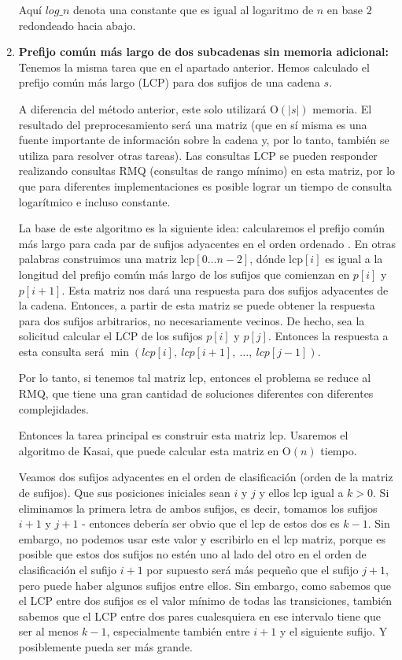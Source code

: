 \begin{enumerate}
Aquí $log\_n$ denota una constante que es igual al logaritmo de $n$ en base $2$ redondeado hacia abajo.
	
	\item \textbf{Prefijo común más largo de dos subcadenas sin memoria adicional:} Tenemos la misma tarea que en el apartado anterior. Hemos calculado el prefijo común más largo (LCP) para dos sufijos de una cadena $s$.

A diferencia del método anterior, este solo utilizará O$(|s|)$ memoria. El resultado del preprocesamiento será una matriz (que en sí misma es una fuente
importante de información sobre la cadena y, por lo tanto, también se utiliza para resolver otras tareas). Las consultas LCP se pueden responder realizando 
consultas RMQ (consultas de rango mínimo) en esta matriz, por lo que para diferentes implementaciones es posible lograr un tiempo de consulta logarítmico e 
incluso constante.

La base de este algoritmo es la siguiente idea: calcularemos el prefijo común más largo para cada par de sufijos adyacentes en el orden ordenado . En otras 
palabras construimos una matriz $\text{lcp}[0 \dots n-2]$, dónde $\text{lcp}[i]$ es igual a la longitud del prefijo común más largo de los sufijos que 
comienzan en $p[i]$ y $p[i+1]$. Esta matriz nos dará una respuesta para dos sufijos adyacentes de la cadena. Entonces, a partir de esta matriz se puede
obtener la respuesta para dos sufijos arbitrarios, no necesariamente vecinos. De hecho, sea la solicitud calcular el LCP de los sufijos $p[i]$ y $p[j]$. 
Entonces la respuesta a esta consulta será $\min(lcp[i],~lcp[i+1],~\dots,~lcp[j-1])$.

Por lo tanto, si tenemos tal matriz $\text{lcp}$, entonces el problema se reduce al RMQ, que tiene una gran cantidad de soluciones diferentes con diferentes
complejidades.

Entonces la tarea principal es construir esta matriz $\text{lcp}$. Usaremos el algoritmo de Kasai, que puede calcular esta matriz en O$(n)$ tiempo.

Veamos dos sufijos adyacentes en el orden de clasificación (orden de la matriz de sufijos). Que sus posiciones iniciales sean $i$ y $j$ y ellos $\text{lcp}$
igual a $k>0$. Si eliminamos la primera letra de ambos sufijos, es decir, tomamos los sufijos $i+1$ y $j+1$ - entonces debería ser obvio que el $\text{lcp}$ de
estos dos es $k-1$. Sin embargo, no podemos usar este valor y escribirlo en el $\text{lcp}$ matriz, porque es posible que estos dos sufijos no estén uno al
lado del otro en el orden de clasificación el sufijo $i+1$ por supuesto será más pequeño que el sufijo $j+1$, pero puede haber algunos sufijos entre ellos. 
Sin embargo, como sabemos que el LCP entre dos sufijos es el valor mínimo de todas las transiciones, también sabemos que el LCP entre dos pares cualesquiera en
ese intervalo tiene que ser al menos $k-1$, especialmente también entre $i+1$ y el siguiente sufijo. Y posiblemente pueda ser más grande.
	

\end{enumerate}
